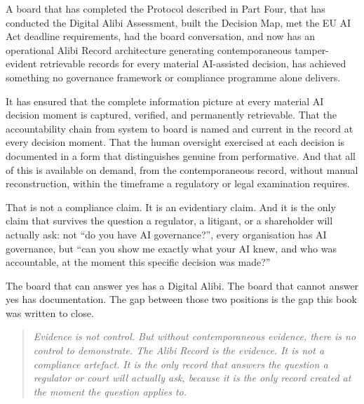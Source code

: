 A board that has completed the Protocol described in Part Four, that has conducted the Digital Alibi Assessment, built the Decision Map, met the EU AI Act deadline requirements, had the board conversation, and now has an operational Alibi Record architecture generating contemporaneous tamper-evident retrievable records for every material AI-assisted decision, has achieved something no governance framework or compliance programme alone delivers.

It has ensured that the complete information picture at every material AI decision moment is captured, verified, and permanently retrievable. That the accountability chain from system to board is named and current in the record at every decision moment. That the human oversight exercised at each decision is documented in a form that distinguishes genuine from performative. And that all of this is available on demand, from the contemporaneous record, without manual reconstruction, within the timeframe a regulatory or legal examination requires.

That is not a compliance claim. It is an evidentiary claim. And it is the only claim that survives the question a regulator, a litigant, or a shareholder will actually ask: not ``do you have AI governance?'', every organisation has AI governance, but ``can you show me exactly what your AI knew, and who was accountable, at the moment this specific decision was made?''

The board that can answer yes has a Digital Alibi. The board that cannot answer yes has documentation. The gap between those two positions is the gap this book was written to close.

\begin{quote}
\emph{Evidence is not control. But without contemporaneous evidence, there is no control to demonstrate. The Alibi Record is the evidence. It is not a compliance artefact. It is the only record that answers the question a regulator or court will actually ask, because it is the only record created at the moment the question applies to.}
\end{quote}

